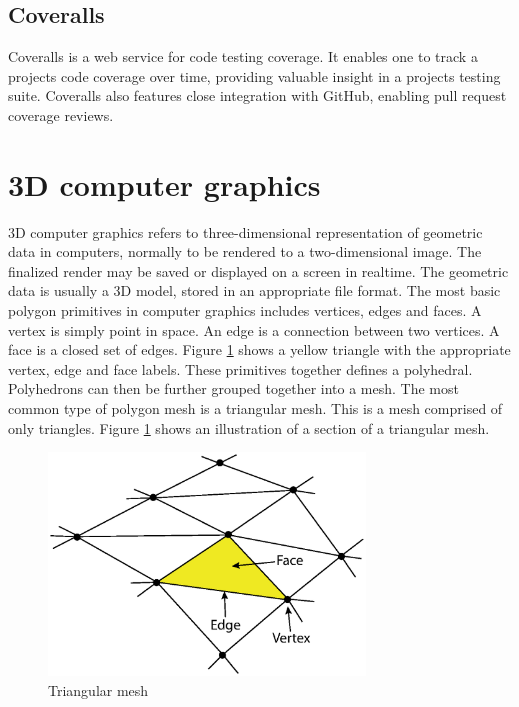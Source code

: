 \subsection{Coveralls}
Coveralls \cite{coveralls} is a web service for code testing coverage. It enables one to track a projects code coverage over time, providing valuable insight in a projects testing suite. Coveralls also features close integration with GitHub, enabling pull request coverage reviews.

\section{3D computer graphics}
3D computer graphics refers to three-dimensional representation of geometric data in computers, normally to be rendered to a two-dimensional image. The finalized render may be saved or displayed on a screen in realtime. The geometric data is usually a 3D model, stored in an appropriate file format. The most basic polygon primitives in computer graphics includes vertices, edges and faces. A vertex is simply point in space. An edge is a connection between two vertices. A face is a closed set of edges. Figure \ref{fig:triangular-mesh} shows a yellow triangle with the appropriate vertex, edge and face labels. These primitives together defines a polyhedral. Polyhedrons can then be further grouped together into a mesh. The most common type of polygon mesh is a triangular mesh. This is a mesh comprised of only triangles. Figure \ref{fig:triangular-mesh} shows an illustration of a section of a triangular mesh.
\begin{figure}[h]
    \centering
    \includegraphics[width=0.75\textwidth]{sections/theory/figures/mesh.eps}
    \caption{Triangular mesh}
    \label{fig:triangular-mesh}
\end{figure}

